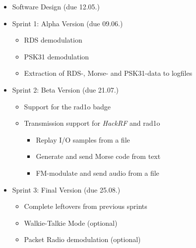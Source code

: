 \begin{itemize}
	\item Software Design (due 12.05.)
	\item Sprint 1: Alpha Version (due 09.06.)
	\begin{itemize}
		\item \ac{RDS} demodulation
		\item \ac{PSK31} demodulation
		\item Extraction of \ac{RDS}-, Morse- and \ac{PSK31}-data to logfiles
	\end{itemize}
	\item Sprint 2: Beta Version (due 21.07.)
	\begin{itemize}
		\item Support for the rad1o badge
		\item Transmission support for \emph{HackRF} and rad1o
		\begin{itemize}
			\item Replay I/O samples from a file
			\item Generate and send Morse code from text
			\item FM-modulate and send audio from a file
		\end{itemize}
	\end{itemize}
	\item Sprint 3: Final Version (due 25.08.)
	\begin{itemize}
		\item Complete leftovers from previous sprints
		\item Walkie-Talkie Mode (optional)
		\item Packet Radio demodulation (optional)
	\end{itemize}
\end{itemize}

